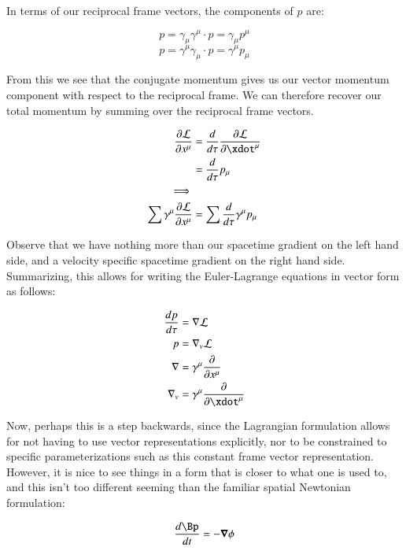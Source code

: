 In terms of our reciprocal frame vectors, the components of $p$ are:

\begin{equation*}
p = \gamma_{\mu} \gamma^{\mu} \cdot p = \gamma_{\mu} p^{\mu}
\end{equation*}
\begin{equation*}
p = \gamma^{\mu} \gamma_{\mu} \cdot p = \gamma^{\mu} p_{\mu}
\end{equation*}

From this we see that the conjugate momentum gives us our vector momentum 
component with respect to the reciprocal frame.  We can therefore recover 
our total momentum by summing over the reciprocal frame vectors.

\begin{align*}
\PD{x^{\mu}}{\LL} 
&= \frac{d}{d\tau}\PD{\xdot^{\mu}}{\LL} \\
&= \frac{d}{d\tau} p_{\mu} \\
\implies \\
\sum \gamma^{\mu} \PD{x^{\mu}}{\LL} &= \sum \frac{d}{d\tau} \gamma^{\mu} p_{\mu} \\
\end{align*}

Observe that we have nothing more than our spacetime gradient on the left hand side, and a velocity
specific spacetime gradient on the right hand side.  Summarizing, this allows for writing the Euler-Lagrange equations in vector form as follows:

\begin{align}
\frac{d p}{d\tau} &= \grad \LL \\
p &= \grad_v \LL \\
\grad &= \gamma^{\mu} \PD{x^{\mu}}{} \\
\grad_v &= \gamma^{\mu} \PD{\xdot^{\mu}}{}
\end{align}

Now, perhaps this is a step backwards, since the Lagrangian formulation allows for not having to use vector representations explicitly, nor to be constrained to specific parameterizations such as this constant frame vector representation.  However, it is nice to see things in a form that is closer to what one is used to, and this isn't too different seeming than the familiar spatial Newtonian formulation:

\begin{equation*}
\frac{d\Bp}{dt} = -\spacegrad \phi
\end{equation*}

